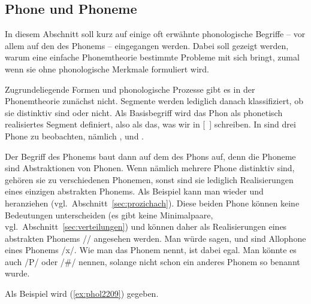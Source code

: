 

\subsection[Phone und Phoneme]{\Opsional Phone und Phoneme}

\label{sec:phonphonem}

In diesem Abschnitt soll kurz auf einige oft erwähnte phonologische Begriffe -- vor allem auf den des Phonems -- eingegangen werden.
Dabei soll gezeigt werden, warum eine einfache Phonemtheorie bestimmte Probleme mit sich bringt, zumal wenn sie ohne phonologische Merkmale formuliert wird.

Zugrundeliegende Formen und phonologische Prozesse gibt es in der Phonemtheorie zunächst nicht.
Segmente werden lediglich danach klassifiziert, ob sie distinktiv sind oder nicht.
Als Basisbegriff wird das Phon als phonetisch realisiertes Segment definiert, also als das, was wir in [~] schreiben.
In \textipa{[ta:k]} sind drei Phone zu beobachten, nämlich \textipa{[t]}, \textipa{[a:]} und \textipa{[k]}.


Der Begriff des Phonems baut dann auf dem des Phons auf, denn die Phoneme sind Abstraktionen von Phonen.
Wenn nämlich mehrere Phone distinktiv sind, gehören sie zu verschiedenen Phonemen, sonst sind sie lediglich Realisierungen eines einzigen abstrakten Phonems.
Als Beispiel kann man wieder \textipa{[\c{c}]} und \textipa{[X]} heranziehen (vgl.\ Abschnitt~\ref{sec:prozichach}).
Diese beiden Phone können keine Bedeutungen unterscheiden (es gibt keine Minimalpaare, vgl.\ Abschnitt~\ref{sec:verteilungen}) und können daher als Realisierungen eines abstrakten Phonems // angesehen werden.
Man würde sagen, \textipa{[\c{c}]} und \textipa{[X]} sind Allophone eines Phonems /x/.
Wie man das Phonem nennt, ist dabei egal.
Man könnte es auch /P/ oder /\#/ nennen, solange nicht schon ein anderes Phonem so benannt wurde.


Als Beispiel wird (\ref{ex:phol2209}) gegeben.

